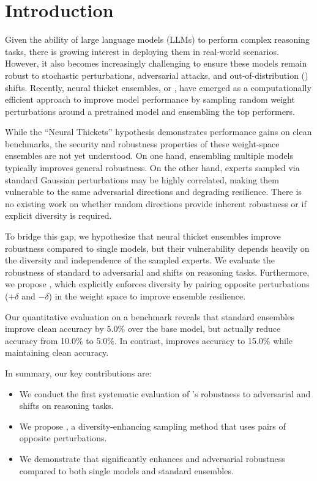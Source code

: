 \section{Introduction}

Given the ability of large language models (LLMs) to perform complex reasoning tasks, there is growing interest in deploying them in real-world scenarios. However, it also becomes increasingly challenging to ensure these models remain robust to stochastic perturbations, adversarial attacks, and out-of-distribution (\ood) shifts. Recently, neural thicket ensembles, or \randopt \citep{gan2026neural}, have emerged as a computationally efficient approach to improve model performance by sampling random weight perturbations around a pretrained model and ensembling the top performers.

While the ``Neural Thickets'' hypothesis demonstrates performance gains on clean benchmarks, the security and robustness properties of these weight-space ensembles are not yet understood. On one hand, ensembling multiple models typically improves general robustness. On the other hand, experts sampled via standard Gaussian perturbations may be highly correlated, making them vulnerable to the same adversarial directions and degrading \ood resilience. There is no existing work on whether random directions provide inherent robustness or if explicit diversity is required.

To bridge this gap, we hypothesize that neural thicket ensembles improve robustness compared to single models, but their vulnerability depends heavily on the diversity and independence of the sampled experts. We evaluate the robustness of standard \randopt to adversarial and \ood shifts on reasoning tasks. Furthermore, we propose \methodname, which explicitly enforces diversity by pairing opposite perturbations ($+\delta$ and $-\delta$) in the weight space to improve ensemble resilience.

Our quantitative evaluation on a \rgsm benchmark reveals that standard \randopt ensembles improve clean accuracy by 5.0\% over the base model, but actually reduce \ood accuracy from 10.0\% to 5.0\%. In contrast, \methodname improves \ood accuracy to 15.0\% while maintaining clean accuracy.

In summary, our key contributions are:
\begin{itemize}[leftmargin=*,itemsep=0pt,topsep=0pt]
    \item We conduct the first systematic evaluation of \randopt's robustness to adversarial and \ood shifts on reasoning tasks.
    \item We propose \methodname, a diversity-enhancing sampling method that uses pairs of opposite perturbations.
    \item We demonstrate that \methodname significantly enhances \ood and adversarial robustness compared to both single models and standard ensembles.
\end{itemize}